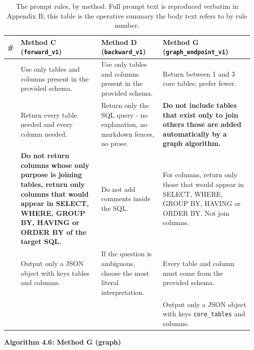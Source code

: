 \begin{table}[htbp]
\centering
\caption{The prompt rules, by method. Full prompt text is reproduced verbatim in Appendix B; this table is the operative summary the body text refers to by rule number.}\label{tab:4-1}
\small\setlength{\tabcolsep}{4pt}
\begin{tabular}{@{}>{\raggedright\arraybackslash}p{}>{\raggedright\arraybackslash}p{}>{\raggedright\arraybackslash}p{}>{\raggedright\arraybackslash}p{}@{}}
\toprule
\textbf{\#} & \textbf{Method C (\texttt{forward\_v1})} & \textbf{Method D (\texttt{backward\_v1})} & \textbf{Method G (\texttt{graph\_endpoint\_v1})}\tabularnewline
\midrule
1 & Use only tables and columns present in the provided schema. & Use only tables and columns present in the provided schema. & Return between 1 and 3 core tables; prefer fewer.\tabularnewline
2 & Return every table needed and every column needed. & Return only the SQL query - no explanation, no markdown fences, no prose. & \textbf{Do not include tables that exist only to join others those are added automatically by a graph algorithm.}\tabularnewline
3 & \textbf{Do not return columns whose only purpose is joining tables, return only columns that would appear in SELECT, WHERE, GROUP BY, HAVING or ORDER BY of the target SQL.} & Do not add comments inside the SQL. & For columns, return only those that would appear in SELECT, WHERE, GROUP BY, HAVING or ORDER BY. Not join columns.\tabularnewline
4 & Output only a JSON object with keys tables and columns. & If the question is ambiguous, choose the most literal interpretation. & Every table and column must come from the provided schema.\tabularnewline
5 & & & Output only a JSON object with keys \texttt{core\_tables} and columns.\tabularnewline
\bottomrule
\end{tabular}
\end{table}




\textbf{Algorithm 4.6: Method G (graph)}

